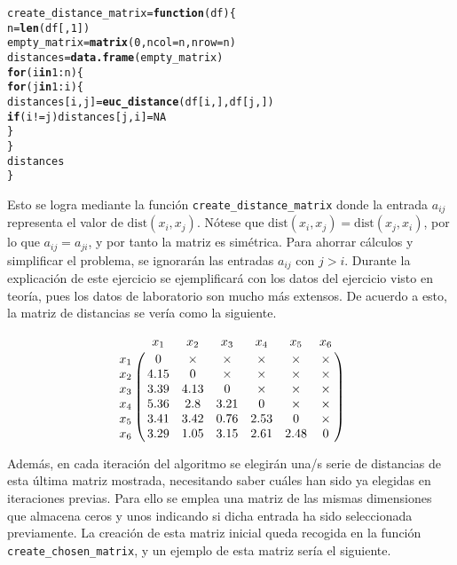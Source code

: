 \documentclass[12pt]{report}\usepackage[]{graphicx}\usepackage[dvipsnames]{xcolor}
\makeatletter
\newcommand{\hlnum}[1]{\textcolor[rgb]{0.686,0.059,0.569}{#1}}%
\newcommand{\hlopt}[1]{\textcolor[rgb]{0,0,0}{#1}}%
\newcommand{\hlstd}[1]{\textcolor[rgb]{0.345,0.345,0.345}{#1}}%
\newcommand{\hlkwa}[1]{\textcolor[rgb]{0.161,0.373,0.58}{\textbf{#1}}}%
\newcommand{\hlkwb}[1]{\textcolor[rgb]{0.69,0.353,0.396}{#1}}%
\newcommand{\hlkwc}[1]{\textcolor[rgb]{0.333,0.667,0.333}{#1}}%
\newcommand{\hlkwd}[1]{\textcolor[rgb]{0.737,0.353,0.396}{\textbf{#1}}}%
\newenvironment{kframe}{%
 \def\at@end@of@kframe{}%
 \ifinner\ifhmode%
  \def\at@end@of@kframe{\end{minipage}}%
  \begin{minipage}{\columnwidth}%
 \fi\fi%
 \def\FrameCommand##1{\hskip\@totalleftmargin \hskip-\fboxsep
 \colorbox{shadecolor}{##1}\hskip-\fboxsep
     \hskip-\linewidth \hskip-\@totalleftmargin \hskip\columnwidth}%
 \MakeFramed {\advance\hsize-\width
   \@totalleftmargin\z@ \linewidth\hsize
   \@setminipage}}%
 {\par\unskip\endMakeFramed%
 \at@end@of@kframe}
\newenvironment{knitrout}{}{} %
\newcommand{\dt}{\text{dist}}
\makeatother
\begin{document}
\begin{knitrout}
\color{fgcolor}\begin{kframe}
\begin{alltt}
\hlstd{create_distance_matrix} \hlkwb{=} \hlkwa{function}\hlstd{(}\hlkwc{df}\hlstd{) \{}
        \hlstd{n} \hlkwb{=} \hlkwd{len}\hlstd{(df[,}\hlnum{1}\hlstd{])}
        \hlstd{empty_matrix} \hlkwb{=} \hlkwd{matrix}\hlstd{(}\hlnum{0}\hlstd{,} \hlkwc{ncol} \hlstd{= n,} \hlkwc{nrow} \hlstd{= n)}
        \hlstd{distances} \hlkwb{=} \hlkwd{data.frame}\hlstd{(empty_matrix)}
        \hlkwa{for} \hlstd{(i} \hlkwa{in} \hlnum{1}\hlopt{:}\hlstd{n) \{}
                \hlkwa{for} \hlstd{(j} \hlkwa{in} \hlnum{1}\hlopt{:}\hlstd{i) \{}
                        \hlstd{distances[i, j]} \hlkwb{=} \hlkwd{euc_distance}\hlstd{(df[i,], df[j,])}
                        \hlkwa{if} \hlstd{(i} \hlopt{!=} \hlstd{j) distances[j, i]} \hlkwb{=} \hlnum{NA}
                \hlstd{\}}
        \hlstd{\}}
        \hlstd{distances}
\hlstd{\}}
\end{alltt}
\end{kframe}
\end{knitrout}
		 		
		 		Esto se logra mediante la función \texttt{create\_distance\_matrix} donde la entrada $a_{ij}$ representa el valor de $\dt(x_i, x_j)$. Nótese que $\dt(x_i, x_j) = \dt(x_j, x_i)$, por lo que $a_{ij} = a_{ji}$, y por tanto la matriz es simétrica. Para ahorrar cálculos y simplificar el problema, se ignorarán las entradas $a_{ij}$ con $j > i$. Durante la explicación de este ejercicio se ejemplificará con los datos del ejercicio visto en teoría, pues los datos de laboratorio son mucho más extensos. De acuerdo a esto, la matriz de distancias se vería como la siguiente. 
		 		
		 		$$
		 		\bordermatrix{
		 			& x_1 & x_2 & x_3 & x_4 & x_5 & x_6 \cr
		 			x_1 & 0 & \times & \times & \times & \times & \times\cr
		 			x_2 & 4.15 & 0 & \times & \times & \times & \times\cr
		 			x_3 & 3.39 & 4.13 & 0 & \times & \times & \times\cr
		 			x_4 & 5.36 & 2.8 & 3.21 & 0 & \times & \times\cr
		 			x_5 & 3.41 & 3.42 & 0.76 & 2.53 & 0 & \times\cr
		 			x_6 & 3.29 & 1.05 & 3.15 & 2.61 & 2.48 & 0
		 		}
		 		$$
		 		
		 		Además, en cada iteración del algoritmo se elegirán una/s serie de distancias de esta última matriz mostrada, necesitando saber cuáles han sido ya elegidas en iteraciones previas. Para ello se emplea una matriz de las mismas dimensiones que almacena ceros y unos indicando si dicha entrada ha sido seleccionada previamente. La creación de esta matriz inicial queda recogida en la función \texttt{create\_chosen\_matrix}, y un ejemplo de esta matriz sería el siguiente. 
		 		
\end{document}
